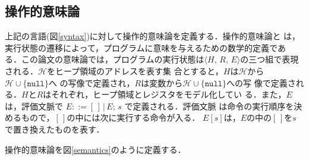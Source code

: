 \subsection{操作的意味論}
上記の言語(図\ref{syntax})に対して操作的意味論を定義する．操作的意味論と
は，実行状態の遷移によって，プログラムに意味を与えるための数学的定義であ
る．この論文の意味論では，プログラムの実行状態は$\langle H,\,R,\,E
\rangle$の三つ組で表現される．$\mathcal{H}$をヒープ領域のアドレスを表す集
合とすると，$H$は$\mathcal{H}$から$\mathcal{H} \cup \{\texttt{null}\}$へ
の写像で定義され，$R$は変数から$\mathcal{H} \cup \{\texttt{null}\}$への写
像で定義される．$H$と$R$はそれぞれ，ヒープ領域とレジスタをモデル化してい
る．また，$E$は，評価文脈で $E ::= [\,]\,|\,E;\,s$ で定義される．評価文脈
は命令の実行順序を決めるもので，$[\,]$の中には次に実行する命令が入る．
$E[s]$は，$E$の中の$[\,]$を$s$で置き換えたものを表す．


\begin{definition}[操作的意味論]
操作的意味論を図\ref{semantics}のように定義する．
\end{definition}

